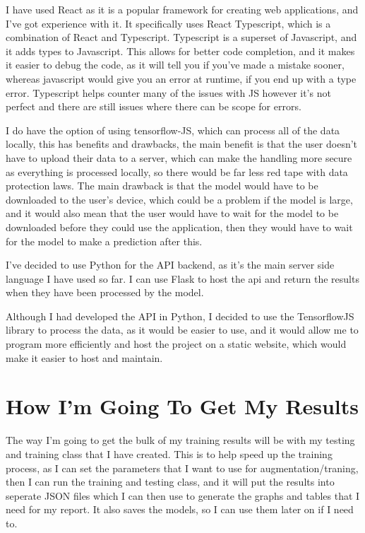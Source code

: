 \documentclass[]{final_report}
\begin{document}
I have used React\cite{React} as it is a popular framework for creating web applications, and I've got experience with it. It specifically uses React Typescript, which is a combination of React and Typescript. Typescript is a superset of Javascript, and it adds types to Javascript.
This allows for better code completion, and it makes it easier to debug the code, as it will tell you if you've made a mistake sooner, whereas javascript would give you an error at runtime, if you end up with a type error. Typescript helps counter many of the issues with JS however it's not perfect and there are still issues where there can be scope for errors.

I do have the option of using tensorflow-JS, which can process all of the data locally, this has benefits and drawbacks, the main benefit is that the user doesn't have to upload their data to a server, which can make the handling more secure as everything is processed locally, so there would be far less red tape with data protection laws. The main drawback is that the model would have to be downloaded to the user's device, which could be a problem if the model is large, and it would also mean that the user would have to wait for the model to be downloaded before they could use the application, then they would have to wait for the model to make a prediction after this.

I've decided to use Python for the API backend, as it's the main server side language I have used so far. I can use Flask to host the api and return the results when they have been processed by the model.

Although I had developed the API in Python, I decided to use the TensorflowJS library to process the data, as it would be easier to use, and it would allow me to program more efficiently and host the project on a static website, which would make it easier to host and maintain.

\section{How I'm Going To Get My Results}

The way I'm going to get the bulk of my training results will be with my testing and training class that I have created. This is to help speed up the training process, as I can set the parameters that I want to use for augmentation/traning, then I can run the training and testing class, and it will put the results into seperate JSON files which I can then use to generate the graphs and tables that I need for my report. It also saves the models, so I can use them later on if I need to.
\end{document}
